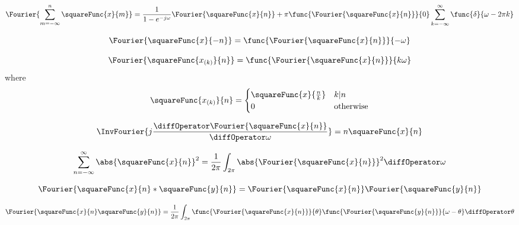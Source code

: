 \begin{description}
    \begin{equation*}
        \Fourier{\sum_{m = -\infty}^n \squareFunc{x}{m}} = \dfrac{1}{ 1 - e^{-j\omega}} \Fourier{\squareFunc{x}{n}} + \pi \func{\Fourier{\squareFunc{x}{n}}}{0} \sum_{k = -\infty}^{\infty} \func{\delta}{\omega - 2\pi k}
    \end{equation*} 
    \item[Time Rerversal]
    \begin{equation*}
        \Fourier{\squareFunc{x}{-n}} = \func{\Fourier{\squareFunc{x}{n}}}{-\omega}
    \end{equation*}
    \item[Time Expansion]
    \begin{equation*}
        \Fourier{\squareFunc{x_{(k)}}{n}} = \func{\Fourier{\squareFunc{x}{n}}}{k\omega}
    \end{equation*}
    where 
    \begin{equation*}
        \squareFunc{x_{(k)}}{n} = \begin{cases}
            \squareFunc{x}{\frac{n}{k}} & k| n\\
            0 & \text{otherwise}
        \end{cases}
    \end{equation*}
    \item 
    \begin{equation*}
        \InvFourier{j \dfrac{\diffOperator \Fourier{\squareFunc{x}{n}}}{\diffOperator \omega}} = n \squareFunc{x}{n}
    \end{equation*}
    \item[Parsevals']
    \begin{equation*}
        \sum_{n = -\infty}^{\infty} \abs{\squareFunc{x}{n}}^2 = \dfrac{1}{2\pi} \int_{2\pi} \abs{\Fourier{\squareFunc{x}{n}}}^2 \diffOperator \omega 
    \end{equation*}
    \item[Convolution] 
    \begin{equation*}
        \Fourier{\squareFunc{x}{n} \ast \squareFunc{y}{n}} = \Fourier{\squareFunc{x}{n}} \Fourier{\squareFunc{y}{n}}
    \end{equation*}
    \item[Multiplication] 
    \begin{equation*}
        \Fourier{\squareFunc{x}{n} \squareFunc{y}{n}}  = \dfrac{1}{2\pi} \int_{2\pi} \func{\Fourier{\squareFunc{x}{n}}}{\theta} \func{\Fourier{\squareFunc{y}{n}}}{\omega - \theta } \diffOperator \theta
    \end{equation*}
\end{description}

